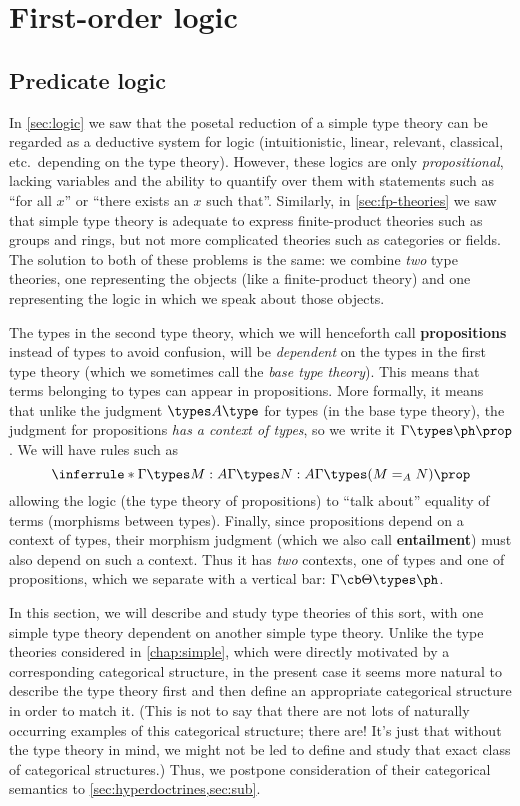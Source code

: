 \chapter{First-order logic}
\label{chap:fol}

\section{Predicate logic}
\label{sec:fol}

In \cref{sec:logic} we saw that the posetal reduction of a simple type theory can be regarded as a deductive system for logic (intuitionistic, linear, relevant, classical, etc.\ depending on the type theory).
However, these logics are only \emph{propositional}, lacking variables and the ability to quantify over them with statements such as ``for all $x$'' or ``there exists an $x$ such that''.
Similarly, in \cref{sec:fp-theories} we saw that simple type theory is adequate to express finite-product theories such as groups and rings, but not more complicated theories such as categories or fields.
The solution to both of these problems is the same: we combine \emph{two} type theories, one representing the objects (like a finite-product theory) and one representing the logic in which we speak about those objects.

The types in the second type theory, which we will henceforth call \textbf{propositions} instead of types to avoid confusion, will be \emph{dependent} on the types in the first type theory (which we sometimes call the \emph{base type theory}).
This means that terms belonging to types can appear in propositions.
More formally, it means that unlike the judgment $\types A \type$ for types (in the base type theory), the judgment for propositions \emph{has a context of types}, so we write it $\Gamma\types \ph\prop$.
We will have rules such as
\[ \inferrule*{\Gamma \types M:A \\ \Gamma\types N:A}{\Gamma\types (M =_A N)\prop} \]
allowing the logic (the type theory of propositions) to ``talk about'' equality of terms (morphisms between types).
Finally, since propositions depend on a context of types, their morphism judgment (which we also call \textbf{entailment}) must also depend on such a context.
Thus it has \emph{two} contexts, one of types and one of propositions, which we separate with a vertical bar: $\Gamma \cb \Theta \types \ph$.

In this section, we will describe and study type theories of this sort, with one simple type theory dependent on another simple type theory.
Unlike the type theories considered in \cref{chap:simple}, which were directly motivated by a corresponding categorical structure, in the present case it seems more natural to describe the type theory first and then define an appropriate categorical structure in order to match it.
(This is not to say that there are not lots of naturally occurring examples of this categorical structure; there are!
It's just that without the type theory in mind, we might not be led to define and study that exact class of categorical structures.)
Thus, we postpone consideration of their categorical semantics to \cref{sec:hyperdoctrines,sec:sub}.

